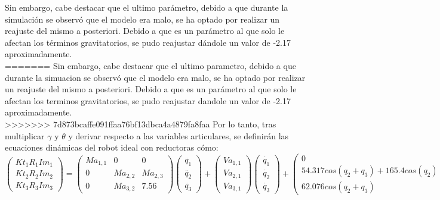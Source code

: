 Sin embargo, cabe destacar que el ultimo parámetro, debido a que durante la simulación se observó que el modelo era malo, se ha optado por realizar un reajuste del mismo a posteriori. Debido a que es un parámetro al que solo le afectan los términos gravitatorios, se pudo reajustar dándole un valor de -2.17 aproximadamente. \\

=======
Sin embargo, cabe destacar que el ultimo parametro, debido a que durante la simuacion se observó que el modelo era malo, se ha optado por realizar un reajuste del mismo a posteriori. Debido a que es un parámetro al que solo le afectan los terminos gravitatorios, se pudo reajustar dandole un valor de -2.17 aproximadamente. \\
>>>>>>> 7d873bcaffe091ffaa76bf13dbca4a4879fa8faa
Por lo tanto, tras multiplicar $\gamma$ y $\theta$ y derivar respecto a las variables articulares, se definirán las ecuaciones dinámicas del robot ideal con reductoras cómo:\\

\[
\begin{pmatrix}
Kt_{1}R_{1}Im_{1} \\

Kt_{2}R_{2}Im_{2} \\

Kt_{3}R_{3}Im_{3}
\end{pmatrix} =
\begin{pmatrix}
Ma_{1,1} & 0 & 0 \\

0 & Ma_{2,2} & Ma_{2,3}\\

0 & Ma_{3,2} & 7.56
\end{pmatrix}
\begin{pmatrix}
\ddot{q_{1}} \\

\ddot{q_{2}}  \\

\ddot{q_{3}}
\end{pmatrix} +
\begin{pmatrix}
Va_{1,1}\\

Va_{2,1} \\

Va_{3,1}
\end{pmatrix}
\begin{pmatrix}
\dot{q_{1}} \\

\dot{q_{2}}  \\

\dot{q_{3}}
\end{pmatrix} +
\begin{pmatrix}
0	\\

54.317cos(q_2 + q_3) + 165.4cos(q_2) \\

62.076cos(q_2 + q_3)
\end{pmatrix}\]



